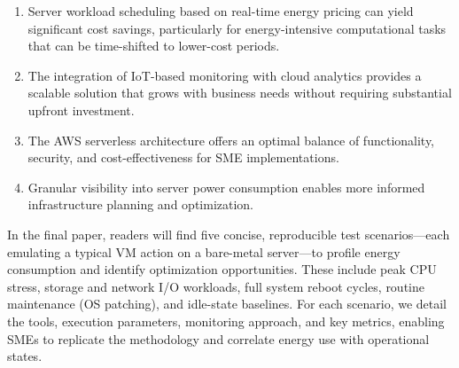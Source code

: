\begin{enumerate}
	\item Server workload scheduling based on real-time energy pricing can yield significant cost
	savings, particularly for energy-intensive computational tasks that can be time-shifted to
	lower-cost periods.
	\item The integration of IoT-based monitoring with cloud analytics provides a scalable solution
	that grows with business needs without requiring substantial upfront investment.
	\item The AWS serverless architecture offers an optimal balance of functionality, security,
	and cost-effectiveness for SME implementations.
	\item Granular visibility into server power consumption enables more informed infrastructure
	planning and optimization.
\end{enumerate}

In the final paper, readers will find five concise, reproducible test scenarios—each emulating a
typical VM action on a bare-metal server—to profile energy consumption and identify optimization
opportunities. These include peak CPU stress, storage and network I/O workloads, full system
reboot cycles, routine maintenance (OS patching), and idle-state baselines. For each scenario,
we detail the tools, execution parameters, monitoring approach, and key metrics, enabling SMEs
to replicate the methodology and correlate energy use with operational states.